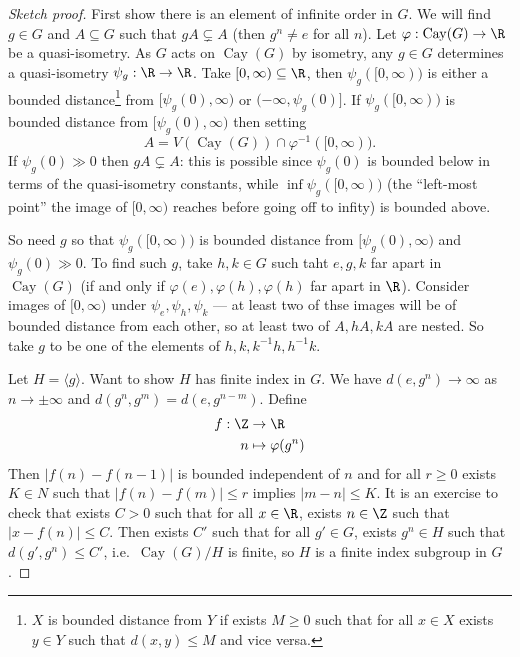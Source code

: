 \documentclass[a4paper]{article}
\DeclareMathOperator{\Cay}{Cay} %
\begin{document}
\begin{proof}[Sketch proof]
  First show there is an element of infinite order in \(G\). We will find \(g \in G\) and \(A \subseteq G\) such that \(gA \subsetneq A\) (then \(g^n \ne e\) for all \(n\)). Let \(\varphi: \Cay(G) \to \R\) be a quasi-isometry. As \(G\) acts on \(\Cay(G)\) by isometry, any \(g \in G\) determines a quasi-isometry \(\psi_g: \R \to \R\). Take \([0, \infty) \subseteq \R\), then \(\psi_g([0, \infty))\) is either a bounded distance\footnote{\(X\) is bounded distance from \(Y\) if exists \(M \geq 0\) such that for all \(x \in X\) exists \(y \in Y\) such that \(d(x, y) \leq M\) and vice versa.} from \([\psi_g(0), \infty)\) or \((-\infty, \psi_g(0)]\). If \(\psi_g([0, \infty))\) is bounded distance from \([\psi_g(0), \infty)\) then setting
  \[
    A = V(\Cay(G)) \cap \varphi^{-1}([0, \infty)).
  \]
  If \(\psi_g(0) \gg 0\) then \(gA \subsetneq A\): this is possible since \(\psi_g(0)\) is bounded below in terms of the quasi-isometry constants, while \(\inf \psi_g([0, \infty))\) (the ``left-most point'' the image of \([0, \infty)\) reaches before going off to infity) is bounded above.

  So need \(g\) so that \(\psi_g([0, \infty))\) is bounded distance from \([\psi_g(0), \infty)\) and \(\psi_g(0) \gg 0\). To find such \(g\), take \(h, k \in G\) such taht \(e, g, k\) far apart in \(\Cay(G)\) (if and only if \(\varphi(e), \varphi(h),  \varphi(h)\) far apart in \(\R\)). Consider images of \([0, \infty)\) under \(\psi_e, \psi_h, \psi_k\) --- at least two of thse images will be of bounded distance from each other, so at least two of \(A, hA, kA\) are nested. So take \(g\) to be one of the elements of \(h, k, k^{-1}h, h^{-1}k\).

  Let \(H = \langle g\rangle\). Want to show \(H\) has finite index in \(G\). We have \(d(e, g^n) \to \infty\) as \(n \to \pm \infty\) and \(d(g^n, g^m) = d(e, g^{n - m})\). Define
  \begin{align*}
    f: \Z &\to \R \\
    n &\mapsto \varphi(g^n)
  \end{align*}
  Then \(|f(n) - f(n - 1)|\) is bounded independent of \(n\) and for all \(r \geq 0\) exists \(K \in N\) such that \(|f(n) - f(m)| \leq r\) implies \(|m - n| \leq K\). It is an exercise to check that exists \(C > 0\) such that for all \(x \in \R\), exists \(n \in \Z\) such that \(|x - f(n)| \leq C\). Then exists \(C'\) such that for all \(g' \in G\), exists \(g^n \in H\) such that \(d(g', g^n) \leq C'\), i.e.\ \(\Cay(G)/H\) is finite, so \(H\) is a finite index subgroup in \(G\).
\end{proof}
\end{document}
